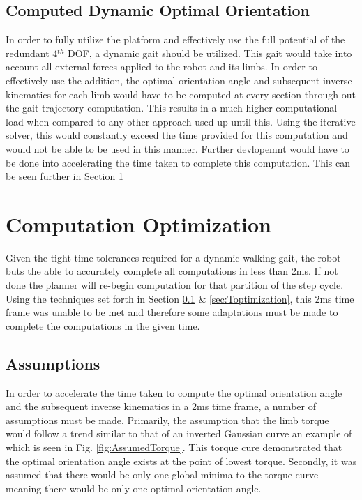 \documentclass[12pt]{report}
\begin{document}
\subsection{Computed Dynamic Optimal Orientation}\label{sec:DynamicOptimization}
In order to fully utilize the platform and effectively use the full potential of the redundant 4$^{th}$ DOF, a dynamic gait should be utilized. This gait would take into account all external forces applied to the robot and its limbs. In order to effectively use the addition, the optimal orientation angle and subsequent inverse kinematics for each limb would have to be computed at every section through out the gait trajectory computation. This results in a much higher computational load when compared to any other approach used up until this. Using the iterative solver, this would constantly exceed the time provided for this computation and would not be able to be used in this manner. Further devlopemnt would have to be done into accelerating the time taken to complete this computation. This can be seen further in Section \ref{sec:Coptimization}


\section{Computation Optimization}\label{sec:Coptimization}
Given the tight time tolerances required for a dynamic walking gait, the robot buts the able to accurately complete all computations in less than 2ms. If not done the planner will re-begin computation for that partition of the step cycle. Using the techniques set forth in Section \ref{sec:DynamicOptimization} \& \ref{sec:Toptimization}, this 2ms time frame was unable to be met and therefore some adaptations must be made to complete the computations in the given time.
\subsection{Assumptions}\label{sec:assumptions}
In order to accelerate the time taken to compute the optimal orientation angle and the subsequent inverse kinematics in a 2ms time frame, a number of assumptions must be made. Primarily, the assumption that the limb torque would follow a trend similar to that of an inverted Gaussian curve an example of which is seen in Fig. \ref{fig:AssumedTorque}. This torque cure demonstrated that the optimal orientation angle exists at the point of lowest torque. Secondly, it was assumed that there would be only one global minima to the torque curve meaning there would be only one optimal orientation angle. 
\end{document}
